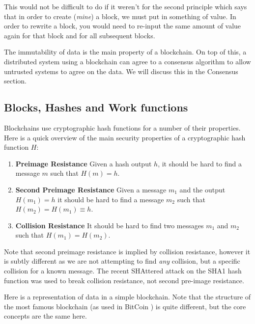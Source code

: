 
This would not be difficult to do if it weren't for the second principle which says that in order to create (\emph{mine}) a block, we must put in something of value. In order to rewrite a block, you would need to re-input the same amount of value again for that block and for all subsequent blocks.

The immutability of data is the main property of a blockchain. On top of this, a distributed system using a blockchain can agree to a consensus algorithm to allow untrusted systems to agree on the data. We will discuss this in the Consensus section.

\subsection{Blocks, Hashes and Work functions}
\label{ch:blockchain:structure:basics}

Blockchains use cryptographic hash functions for a number of their properties. Here is a quick overview of the main security properties of a cryptographic hash function $H$:

\begin{enumerate}
    \item \textbf{Preimage Resistance} Given a hash output $h$, it should be hard to find a message $m$ such that $H(m) = h$.
    \item \textbf{Second Preimage Resistance} Given a message $m_1$ and the output $H(m_1) = h$ it should be hard to find a message $m_2$ such that $H(m_2) = H(m_1) \equiv h$.
    \item \textbf{Collision Resistance} It should be hard to find two messages $m_1$ and $m_2$ such that $H(m_1) = H(m_2)$.
\end{enumerate}

Note that second preimage resistance is implied by collision resistance, however it is subtly different as we are not attempting to find \emph{any} collision, but a specific collision for a known message. The recent SHAttered \cite{katz_first_2017} attack on the SHA1 hash function was used to break collision resistance, not second pre-image resistance.

Here is a representation of data in a simple blockchain. Note that the structure of the most famous blockchain (as used in BitCoin ) is quite different, but the core concepts are the same here.


